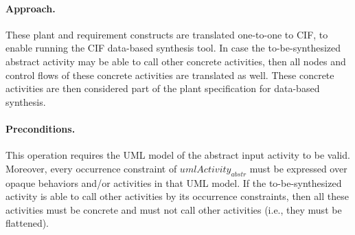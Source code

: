 \documentclass{article}
\newcommand{\var}[1]{\ensuremath{\mathit{#1}}}
\theoremstyle{definition}
\begin{document}
\paragraph{Approach.}
These plant and requirement constructs are translated one-to-one to CIF, to enable running the CIF data-based synthesis tool.
In case the to-be-synthesized abstract activity may be able to call other concrete activities, then all nodes and control flows of these concrete activities are translated as well.
These concrete activities are then considered part of the plant specification for data-based synthesis.

\paragraph{Preconditions.}
This operation requires the UML model of the abstract input activity to be valid.
Moreover, every occurrence constraint of \var{umlActivity_{abstr}} must be expressed over opaque behaviors and/or activities in that UML model.
If the to-be-synthesized activity is able to call other activities by its occurrence constraints, then all these activities must be concrete and must not call other activities (i.e., they must be flattened).
\end{document}
